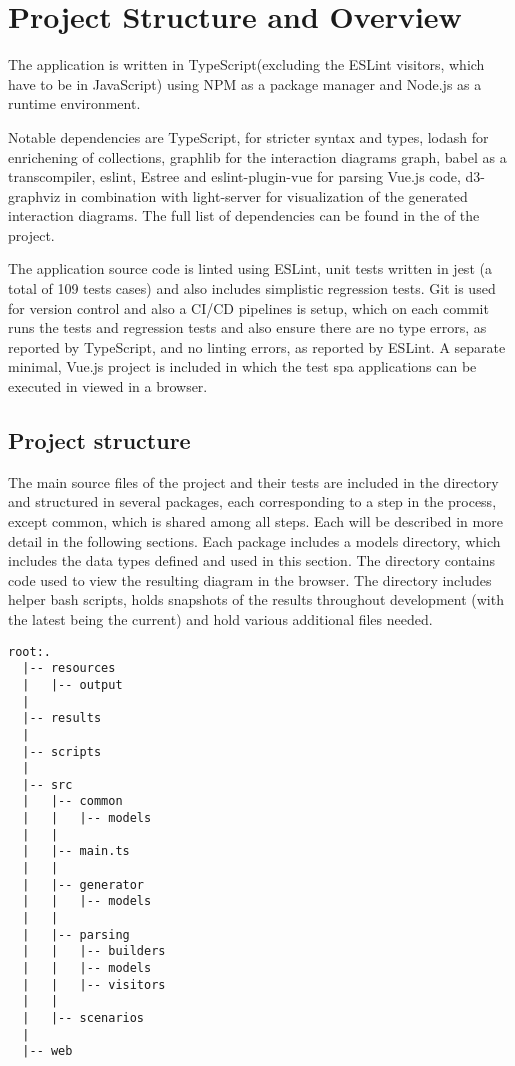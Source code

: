 \section{Project Structure and Overview}
The application is written in TypeScript(excluding the ESLint visitors, which have to be in JavaScript) using NPM as a package manager and Node.js as a runtime environment. 

Notable dependencies are TypeScript, for stricter syntax and types, lodash\parencite{lodash} for enrichening of collections, graphlib\parencite{graphlib} for the interaction diagrams graph,  babel\parencite{babel} as a transcompiler, eslint\parencite{eslintMainPage}, Estree\parencite{estreeASTSpec} and eslint-plugin-vue\parencite{eslint_vue_parser} for parsing Vue.js code, d3-graphviz\parencite{graph_viz} in combination with light-server\parencite{light_server} for visualization of the generated interaction diagrams. The full list of dependencies can be found in the  of the project.

The application source code is linted using ESLint, unit tests written in jest (a total of 109 tests cases) and also includes simplistic regression tests. Git is used for version control and also a CI/CD pipelines is setup, which on each commit runs the tests and regression tests and also ensure there are no type errors, as reported by TypeScript, and no linting errors, as reported by ESLint. 
A separate minimal, Vue.js project is included \parencite{KarakoA2021Feb} in which the test \gls{spa} applications can be executed in viewed in a browser.

\subsection{Project structure}
The main source files of the project and their tests are included in the  directory and structured in several packages, each corresponding to a step in the process, except common, which is shared among all steps. Each will be described in more detail in the following sections.
Each package includes a models directory, which includes the data types defined and used in this section.
The  directory contains code used to view the resulting diagram in the browser.
The  directory includes helper bash scripts,  holds snapshots of the results throughout development (with the latest being the current) and  hold various additional files needed.
\begin{lstlisting}[basicstyle=\tiny]
  root:.
  |-- resources
  |   |-- output
  |
  |-- results
  |
  |-- scripts
  |
  |-- src
  |   |-- common
  |   |   |-- models
  |   |
  |   |-- main.ts
  |   |
  |   |-- generator
  |   |   |-- models
  |   |
  |   |-- parsing
  |   |   |-- builders
  |   |   |-- models
  |   |   |-- visitors
  |   |
  |   |-- scenarios
  |
  |-- web
\end{lstlisting}


